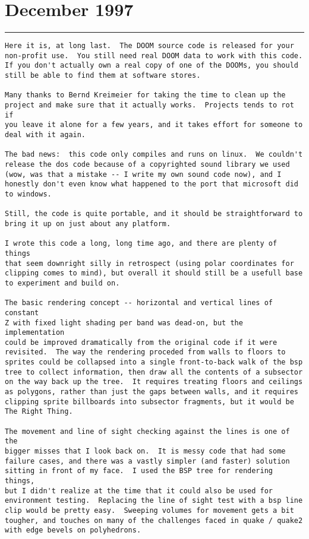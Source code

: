\section{December 1997}
\hrule \par \bigskip
{}
\begin{verbatim}
Here it is, at long last.  The DOOM source code is released for your
non-profit use.  You still need real DOOM data to work with this code.
If you don't actually own a real copy of one of the DOOMs, you should
still be able to find them at software stores.

Many thanks to Bernd Kreimeier for taking the time to clean up the
project and make sure that it actually works.  Projects tends to rot if
you leave it alone for a few years, and it takes effort for someone to
deal with it again.

The bad news:  this code only compiles and runs on linux.  We couldn't
release the dos code because of a copyrighted sound library we used
(wow, was that a mistake -- I write my own sound code now), and I
honestly don't even know what happened to the port that microsoft did
to windows.

Still, the code is quite portable, and it should be straightforward to
bring it up on just about any platform.

I wrote this code a long, long time ago, and there are plenty of things
that seem downright silly in retrospect (using polar coordinates for
clipping comes to mind), but overall it should still be a usefull base
to experiment and build on.

The basic rendering concept -- horizontal and vertical lines of constant
Z with fixed light shading per band was dead-on, but the implementation
could be improved dramatically from the original code if it were
revisited.  The way the rendering proceded from walls to floors to
sprites could be collapsed into a single front-to-back walk of the bsp
tree to collect information, then draw all the contents of a subsector
on the way back up the tree.  It requires treating floors and ceilings
as polygons, rather than just the gaps between walls, and it requires
clipping sprite billboards into subsector fragments, but it would be
The Right Thing.

The movement and line of sight checking against the lines is one of the
bigger misses that I look back on.  It is messy code that had some
failure cases, and there was a vastly simpler (and faster) solution
sitting in front of my face.  I used the BSP tree for rendering things,
but I didn't realize at the time that it could also be used for
environment testing.  Replacing the line of sight test with a bsp line
clip would be pretty easy.  Sweeping volumes for movement gets a bit
tougher, and touches on many of the challenges faced in quake / quake2
with edge bevels on polyhedrons.


\end{verbatim}
